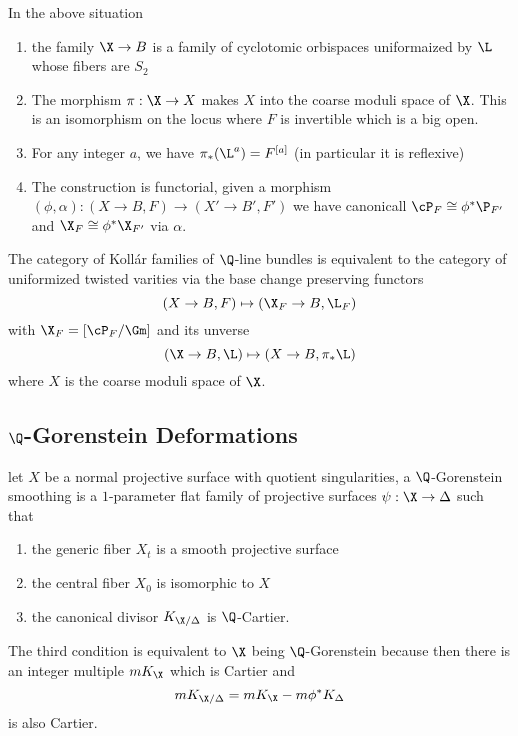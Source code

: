 \documentclass[12pt]{article}
\begin{document}
\begin{prop}[AH, Prop. 5.3.2]
In the above situation
\begin{enumerate}
\item the family $\X \to B$ is a family of cyclotomic orbispaces uniformaized by $\L$ whose fibers are $S_2$
\item The morphism $\pi : \X \to X$ makes $X$ into the coarse moduli space of $\X$. This is an isomorphism on the locus where $F$ is invertible which is a big open.
\item For any integer $a$, we have $\pi_* (\L^a) = F^{[a]}$ (in particular it is reflexive)
\item The construction is functorial, given a morphism $(\phi, \alpha) : (X \to B, F) \to (X' \to B', F')$ we have canonicall $\cP_F \cong \phi^* \P_{F'}$ and $\X_F \cong \phi^* \X_{F'}$ via $\alpha$.
\end{enumerate}
\end{prop}

\begin{theorem}[AH, Theorem 5.3.6]
The category of Koll\'{a}r families of $\Q$-line bundles is equivalent to the category of uniformized twisted varities via the base change preserving functors
\[ (X \to B, F) \mapsto (\X_F \to B, \L_F) \]
with $\X_F = [\cP_F / \Gm]$ and its unverse
\[ (\X \to B, \L) \mapsto (X \to B, \pi_* \L) \]
where $X$ is the coarse moduli space of $\X$.
\end{theorem}




\subsection{$\Q$-Gorenstein Deformations}

\begin{defn}
let $X$ be a normal projective surface with quotient singularities, a $\Q$-Gorenstein smoothing is a $1$-parameter flat family of projective surfaces $\psi : \X \to \Delta$ such that
\begin{enumerate}
\item the generic fiber $X_t$ is a smooth projective surface
\item the central fiber $X_0$ is isomorphic to $X$
\item the canonical divisor $K_{\X / \Delta}$ is $\Q$-Cartier.
\end{enumerate}
\end{defn}

\begin{rmk}
The third condition is equivalent to $\X$ being $\Q$-Gorenstein because then there is an integer multiple $m K_{\X}$ which is Cartier and 
\[ m K_{\X / \Delta} = m K_{\X} - m \phi^* K_{\Delta} \]
is also Cartier. 
\end{rmk}
\end{document}
